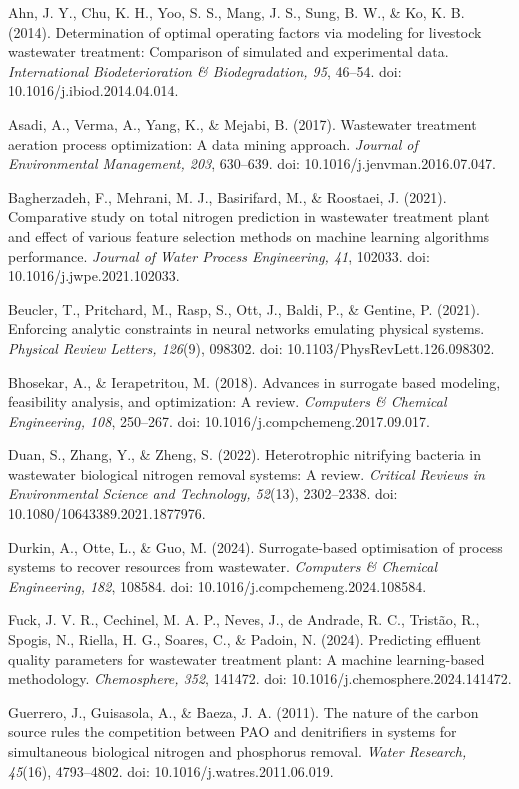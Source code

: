 \documentclass[a4paper,fleqn]{cas-sc}
\begin{document}
\noindent Ahn, J. Y., Chu, K. H., Yoo, S. S., Mang, J. S., Sung, B. W., \& Ko, K. B. (2014). Determination of optimal operating factors via modeling for livestock wastewater treatment: Comparison of simulated and experimental data. \textit{International Biodeterioration \& Biodegradation, 95}, 46--54. doi: 10.1016/j.ibiod.2014.04.014.

\noindent Asadi, A., Verma, A., Yang, K., \& Mejabi, B. (2017). Wastewater treatment aeration process optimization: A data mining approach. \textit{Journal of Environmental Management, 203}, 630--639. doi: 10.1016/j.jenvman.2016.07.047.

\noindent Bagherzadeh, F., Mehrani, M. J., Basirifard, M., \& Roostaei, J. (2021). Comparative study on total nitrogen prediction in wastewater treatment plant and effect of various feature selection methods on machine learning algorithms performance. \textit{Journal of Water Process Engineering, 41}, 102033. doi: 10.1016/j.jwpe.2021.102033.

\noindent Beucler, T., Pritchard, M., Rasp, S., Ott, J., Baldi, P., \& Gentine, P. (2021). Enforcing analytic constraints in neural networks emulating physical systems. \textit{Physical Review Letters, 126}(9), 098302. doi: 10.1103/PhysRevLett.126.098302.

\noindent Bhosekar, A., \& Ierapetritou, M. (2018). Advances in surrogate based modeling, feasibility analysis, and optimization: A review. \textit{Computers \& Chemical Engineering, 108}, 250--267. doi: 10.1016/j.compchemeng.2017.09.017.

\noindent Duan, S., Zhang, Y., \& Zheng, S. (2022). Heterotrophic nitrifying bacteria in wastewater biological nitrogen removal systems: A review. \textit{Critical Reviews in Environmental Science and Technology, 52}(13), 2302--2338. doi: 10.1080/10643389.2021.1877976.

\noindent Durkin, A., Otte, L., \& Guo, M. (2024). Surrogate-based optimisation of process systems to recover resources from wastewater. \textit{Computers \& Chemical Engineering, 182}, 108584. doi: 10.1016/j.compchemeng.2024.108584.

\noindent Fuck, J. V. R., Cechinel, M. A. P., Neves, J., de Andrade, R. C., Trist\~ao, R., Spogis, N., Riella, H. G., Soares, C., \& Padoin, N. (2024). Predicting effluent quality parameters for wastewater treatment plant: A machine learning-based methodology. \textit{Chemosphere, 352}, 141472. doi: 10.1016/j.chemosphere.2024.141472.

\noindent Guerrero, J., Guisasola, A., \& Baeza, J. A. (2011). The nature of the carbon source rules the competition between PAO and denitrifiers in systems for simultaneous biological nitrogen and phosphorus removal. \textit{Water Research, 45}(16), 4793--4802. doi: 10.1016/j.watres.2011.06.019.
\end{document}
